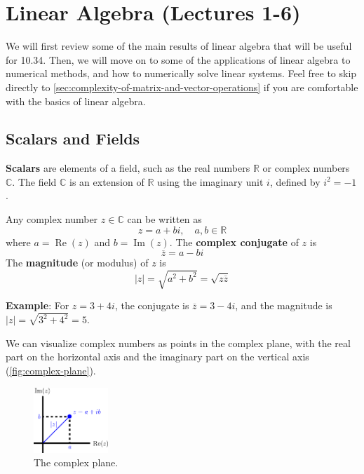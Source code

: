 \section{Linear Algebra (Lectures 1-6)}
We will first review some of the main results of linear algebra that will be useful for 10.34. Then, we will move on to some of the applications of linear algebra to numerical methods, and how to numerically solve linear systems. Feel free to skip directly to \autoref{sec:complexity-of-matrix-and-vector-operations} if you are comfortable with the basics of linear algebra.

\subsection{Scalars and Fields}
\textbf{Scalars} are elements of a field, such as the real numbers $ \mathbb{R} $ or complex numbers $ \mathbb{C} $. The field $ \mathbb{C} $ is an extension of $ \mathbb{R} $ using the imaginary unit $ i $, defined by $ i^2 = -1 $.

Any complex number $ z \in \mathbb{C} $ can be written as
\begin{equation*}
    z = a + b i, \quad a, b \in \mathbb{R}
\end{equation*}
where $ a = \operatorname{Re}(z) $ and $ b = \operatorname{Im}(z) $. The \textbf{complex conjugate} of $ z $ is
\begin{equation*}
    \overline{z} = a - b i
\end{equation*}
The \textbf{magnitude} (or modulus) of $ z $ is
\begin{equation*}
    |z| = \sqrt{a^2 + b^2} = \sqrt{z \overline{z}}
\end{equation*}

\begin{exampleBox}
    \textbf{Example}: For $ z = 3 + 4i $, the conjugate is $ \overline{z} = 3 - 4i $, and the magnitude is $ |z| = \sqrt{3^2 + 4^2} = 5 $.
\end{exampleBox}

We can visualize complex numbers as points in the complex plane, with the real part on the horizontal axis and the imaginary part on the vertical axis (\autoref{fig:complex-plane}).

\begin{figure}[H]
    \centering
    \includegraphics[width=0.25\textwidth]{figs/linear-algebra/complex-plane.pdf}
    \caption{The complex plane.}
    \label{fig:complex-plane}
\end{figure}


